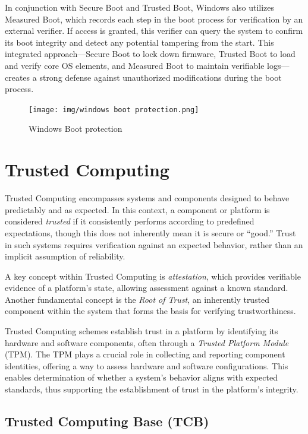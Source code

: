 In conjunction with Secure Boot and Trusted Boot, Windows also
utilizes Measured Boot, which records each step in the boot process
for verification by an external verifier. If access is granted, this
verifier can query the system to confirm its boot integrity and detect
any potential tampering from the start. This integrated
approach—Secure Boot to lock down firmware, Trusted Boot to load and
verify core OS elements, and Measured Boot to maintain verifiable
logs—creates a strong defense against unauthorized modifications
during the boot process.


\begin{figure}
  \centering
  \texttt{[image: img/windows boot
  protection.png]}
  \caption{Windows Boot protection}
  \label{fig:windows boot protection}
\end{figure}

\section{Trusted Computing}

Trusted Computing encompasses systems and components designed 
to behave predictably and as expected. In this context, a component 
or platform is considered \textit{trusted} if it consistently performs 
according to predefined expectations, though this does not inherently 
mean it is secure or “good.” Trust in such systems requires verification 
against an expected behavior, rather than an implicit assumption of 
reliability.

A key concept within Trusted Computing is \textit{attestation}, which 
provides verifiable evidence of a platform’s state, allowing assessment 
against a known standard. Another fundamental concept is the 
\textit{Root of Trust}, an inherently trusted component within the 
system that forms the basis for verifying trustworthiness.

Trusted Computing schemes establish trust in a platform by 
identifying its hardware and software components, often through 
a \textit{Trusted Platform Module} (TPM). The TPM plays a crucial 
role in collecting and reporting component identities, offering a way 
to assess hardware and software configurations. This enables 
determination of whether a system’s behavior aligns with expected 
standards, thus supporting the establishment of trust in the platform’s 
integrity.

\subsection{Trusted Computing Base (TCB)}

